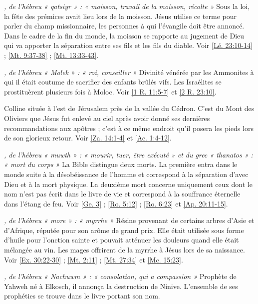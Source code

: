 \begin{multicols}{2}
\textit{, de l'hébreu « qatsiyr » : « moisson, travail de la moisson, récolte »}\newline
Sous la loi, la fête des prémices avait lieu lors de la moisson. Jésus utilise ce terme pour parler du champ missionnaire, les personnes à qui l'évangile doit être annoncé. Dans le cadre de la fin du monde, la moisson se rapporte au jugement de Dieu qui va apporter la séparation entre ses fils et les fils du diable. Voir \vref{Lé. 23:10-14} ; \vref{Mt. 9:37-38} ; \vref{Mt. 13:33-43}.

\textit{, de l'hébreu « Molek » : « roi, conseiller »}\newline
Divinité vénérée par les Ammonites à qui il était coutume de sacrifier des enfants brûlés vifs. Les Israélites se prostituèrent plusieurs fois à Moloc. Voir \vref{1 R. 11:5-7} et \vref{2 R. 23:10}.

\textit{}\newline
Colline située à l'est de Jérusalem près de la vallée du Cédron. C'est du Mont des Oliviers que Jésus fut enlevé au ciel après avoir donné ses dernières recommandations aux apôtres ; c'est à ce même endroit qu'il posera les pieds lors de son glorieux retour. Voir \vref{Za. 14:1-4} et \vref{Ac. 1:4-12}.

\textit{, de l'hébreu « muwth » : « mourir, tuer, être exécuté » et du grec « thanatos » : « mort du corps »}\newline
La Bible distingue deux morts. La première entra dans le monde suite à la désobéissance de l'homme et correspond à la séparation d'avec Dieu et à la mort physique. La deuxième mort concerne uniquement ceux dont le nom n'est pas écrit dans le livre de vie et correspond à la souffrance éternelle dans l'étang de feu. Voir \vref{Ge. 3} ; \vref{Ro. 5:12} ; \vref{Ro. 6:23} et \vref{Ap. 20:11-15}.

\textit{, de l'hébreu « more » : « myrrhe »}\newline
Résine provenant de certains arbres d'Asie et d'Afrique, réputée pour son arôme de grand prix. Elle était utilisée sous forme d'huile pour l'onction sainte et pouvait atténuer les douleurs quand elle était mélangée au vin. Les mages offrirent de la myrrhe à Jésus lors de sa naissance. Voir \vref{Ex. 30:22-30} ; \vref{Mt. 2:11} ; \vref{Mt. 27:34} et \vref{Mc. 15:23}.

\textit{, de l'hébreu « Nachuwm » : « consolation, qui a compassion »}\newline
Prophète de Yahweh né à Elkosch, il annonça la destruction de Ninive. L'ensemble de ses prophéties se trouve dans le livre portant son nom.


\end{multicols}
